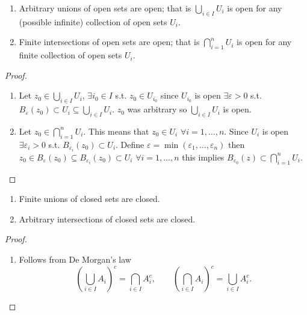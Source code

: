 \documentclass[10pt, a4paper]{article}
\begin{document}
\begin{lemma}\phantom{}
    \begin{enumerate}[label = (\roman*)]
        \item Arbitrary unions of open sets are open;
        that is $\bigcup_{i \in I}U_i$ is open for any
        (possible infinite)
        collection of open sets $U_i$.

        \item Finite intersections of open sets are open;
        that is $\bigcap_{i = 1}^{n}U_i$ is open for any finite collection of open sets $U_i$.
    \end{enumerate}

    \begin{proof}\phantom{}
        \begin{enumerate}[label = (\roman*)]
            \item Let $z_0 \in \bigcup_{i \in I}U_i$,
            $\exists i_0 \in I$ s.t. $z_0 \in U_{i_0}$ since $U_{i_0}$ is open $\exists \varepsilon > 0$ s.t. $B_{\varepsilon}(z_0) \subset U_i \subseteq \bigcup_{i \in I}U_i$.
            $z_0$ was arbitrary so $\bigcup_{i \in I}U_i$ is open.

            \item Let $z_0 \in \bigcap_{i = 1}^{n}U_i$.
            This means that $z_0 \in U_i$ $\forall i = 1, \dotsc, n$.
            Since $U_i$ is open $\exists \varepsilon_i > 0$ s.t. $B_{\varepsilon_i}(z_0) \subset U_i$.
            Define $\varepsilon = \min(\varepsilon_1, \dotsc, \varepsilon_n)$ then $z_0 \in B_{\varepsilon}(z_0) \subseteq B_{\varepsilon_i}(z_0) \subset U_i$ $\forall i = 1, \dotsc, n$ this implies $B_{\varepsilon_0}(z) \subset \bigcap_{i = 1}^{n}U_i$.
        \end{enumerate}
    \end{proof}
\end{lemma}

\begin{corollary}\phantom{}
    \begin{enumerate}[label = (\roman*)]
        \item Finite unions of closed sets are closed.

        \item Arbitrary intersections of closed sets are closed.
    \end{enumerate}

    \begin{proof}\phantom{}
        \begin{enumerate}[label = (\roman*)]
            \item Follows from De Morgan's law
            \[
            \left(\bigcup_{i \in I}A_i\right) ^ c = \bigcap_{i \in I}A_i ^ c, \qquad \left(\bigcap_{i \in I}A_i\right) ^ c = \bigcup_{i \in I}A_i ^ c.
            \]
        \end{enumerate}
    \end{proof}
\end{corollary}
\end{document}
